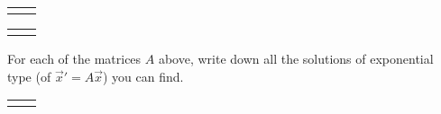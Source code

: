 \documentclass[12pt,twoside]{exam}
\begin{document}
\begin{questions}
\begin{parts}
\begin{tabularx}{\linewidth}{XX}
            \part $\begin{pmatrix}
                1 & 3 & 0 \\
                3 & 1 & 0 \\
                0 & 0 & -2        
            \end{pmatrix}$ \\[1.0in]
        \end{tabularx}
        \newpage
        \begin{tabularx}{\linewidth}{XX}
            \part $\begin{pmatrix}
                1 & 0 & 0 & 0\\
                0 & 1 & 5 & -10 \\
                1 & 0 & 2 & 0 \\
                1 & 0 & 0 & 3         
            \end{pmatrix}$ &
            \part $\begin{pmatrix}
                2 & 1 & 0 \\
                0 & 2 & 0 \\
                0 & 0 & 2         
            \end{pmatrix}$ \\[1.0in]
        \end{tabularx}
    \end{parts}

    \question For each of the matrices $A$ above, write down all the
    solutions of exponential type (of $\vec{x}' = A \vec{x}$) you can find.

    \begin{parts}
        \begin{tabularx}{\linewidth}{XX}
            \part $\begin{pmatrix}
                1 & 2 \\ 0 & -3 
            \end{pmatrix}$ &

\end{tabularx}
\end{parts}
\end{questions}
\end{document}
